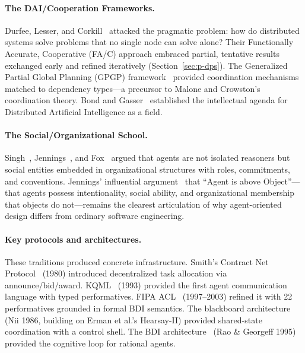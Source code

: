 \documentclass{article}
\begin{document}
\paragraph{The DAI/Cooperation Frameworks.}
Durfee, Lesser, and Corkill~\citep{lesser1983functionally, durfee1999distributed}
attacked the pragmatic problem: how do distributed systems solve problems that no single
node can solve alone? Their Functionally Accurate, Cooperative (FA/C) approach embraced
partial, tentative results exchanged early and refined iteratively
(Section~\ref{sec:p-dps}). The Generalized Partial Global Planning (GPGP)
framework~\citep{decker1995gpgp} provided coordination mechanisms matched to dependency
types---a precursor to Malone and Crowston's coordination theory. Bond and
Gasser~\citep{bond1988readings} established the intellectual agenda for Distributed
Artificial Intelligence as a field.

\paragraph{The Social/Organizational School.}
Singh~\citep{singh1999social}, Jennings~\citep{jennings2000agent}, and
Fox~\citep{fox1998organizational} argued that agents are not isolated reasoners but
social entities embedded in organizational structures with roles, commitments, and
conventions. Jennings' influential argument~\citep{jennings2000agent} that ``Agent is
above Object''---that agents possess intentionality, social ability, and organizational
membership that objects do not---remains the clearest articulation of why agent-oriented
design differs from ordinary software engineering.

\paragraph{Key protocols and architectures.}
These traditions produced concrete infrastructure. Smith's Contract Net
Protocol~\citep{smith1980contract} (1980) introduced decentralized task allocation via
announce/bid/award. KQML~\citep{finin1994kqml} (1993) provided the first agent
communication language with typed performatives. FIPA ACL~\citep{fipaacl2002}
(1997--2003) refined it with 22 performatives grounded in formal BDI semantics. The
blackboard architecture~\citep{nii1986blackboard} (Nii 1986, building on Erman et al.'s
Hearsay-II) provided shared-state coordination with a control shell. The BDI
architecture~\citep{rao1995bdi} (Rao \& Georgeff 1995) provided the cognitive loop for
rational agents.
\end{document}
